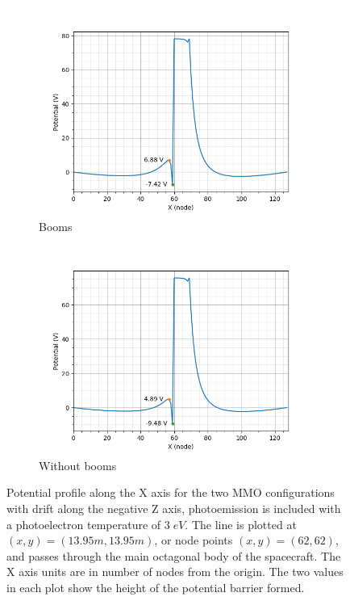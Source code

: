 \begin{figure}[H]
  \begin{subfigure}[b]{0.6\textwidth}
  \includegraphics[width=\textwidth]{figures/MMO/PHTemp/WB/L_PHTemp_WB.png}
  \caption{Booms}
  \label{fig:L_PHTemp_WB}
\end{subfigure}
\begin{subfigure}[b]{0.6\textwidth}
  \includegraphics[width=\textwidth]{figures/MMO/PHTemp/NB/L_PHTemp_NB.png}
  \caption{Without booms}
  \label{fig:L_PHTemp_NB}
\end{subfigure}
\label{fig:Line_PHTemp}
\caption{Potential profile along the X axis for the two MMO configurations with drift along the negative Z axis, photoemission is included with a photoelectron temperature of $3 \; eV$. The line is plotted at $(x,y) = (13.95 m, 13.95 m)$, or node points $(x,y) = (62,62)$, and passes through the main octagonal body of the spacecraft. The X axis units are in number of nodes from the origin. The two values in each plot show the height of the potential barrier formed.}
\end{figure}

